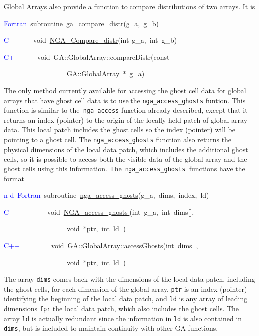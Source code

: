Global Arrays also provide a function to compare distributions of
two arrays. It is
\begin{lyxcode}
\textcolor{blue}{Fortran}~subroutine~\href{http://www.emsl.pnl.gov/docs/global/ga_ops.html\#ga_compare_distr}{ga\_{}compare\_{}distr}(g\_a,~g\_b)

\textcolor{blue}{C}~~~~~~~void~\href{http://www.emsl.pnl.gov/docs/global/c_nga_ops.html\#ga_compare_distr}{NGA\_{}Compare\_{}distr}(int~g\_a,~int~g\_b)~

\textcolor{blue}{C++}~~~~~void~GA::GlobalArray::compareDistr(const~

~~~~~~~~~~~~~~~~~~GA::GlobalArray~{*}~g\_a)
\end{lyxcode}
The only method currently available for accessing the ghost cell data
for global arrays that have ghost cell data is to use the \texttt{nga\_access\_ghosts}
funtion. This function is similar to the\texttt{ nga\_access} function
already described, except that it returns an index (pointer) to the
origin of the locally held patch of global array data. This local
patch includes the ghost cells so the index (pointer) will be pointing
to a ghost cell. The \texttt{nga\_access\_ghosts} function also returns
the physical dimensions of the local data patch, which includes the
additional ghost cells, so it is possible to access both the visible
data of the global array and the ghost cells using this information.
The\texttt{ nga\_access\_ghosts }functions have the format
\begin{lyxcode}
\textcolor{blue}{n-d~Fortran}~subroutine~\href{http://www.emsl.pnl.gov/docs/global/ga_ops.html\#ga_access_ghosts}{nga\_{}access\_{}ghosts}(g\_a,~dims,~index,~ld)~

\textcolor{blue}{C}~~~~~~~~~~~void~\href{http://www.emsl.pnl.gov/docs/global/c_nga_ops.html\#nga_access_ghosts}{NGA\_{}access\_{}ghosts }(int~g\_a,~int~dims{[}{]},~

~~~~~~~~~~~~~~~~~~void~{*}ptr,~int~ld{[}{]})~

\textcolor{blue}{C++~}~~~~~~~~void~GA::GlobalArray::accessGhosts(int~dims{[}{]},

~~~~~~~~~~~~~~~~~~void~{*}ptr,~int~ld{[}{]})~
\end{lyxcode}
The array \texttt{dims} comes back with the dimensions of the local
data patch, including the ghost cells, for each dimension of the global
array, \texttt{ptr} is an index (pointer) identifying the beginning
of the local data patch, and \texttt{ld} is any array of leading dimensions
\texttt{fpr} the local data patch, which also includes the ghost cells.
The array \texttt{ld} is actually redundant since the information
in \texttt{ld} is also contained in \texttt{dims}, but is included
to maintain continuity with other GA functions.


